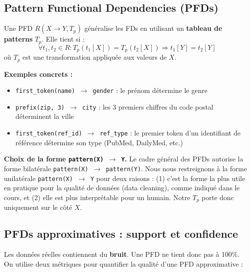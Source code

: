 \documentclass[12pt,a4paper]{article}
\begin{document}
\subsection{Pattern Functional Dependencies (PFDs)}

\begin{tcolorbox}[colback=green!5!white, colframe=green!50!black, title=D\'{e}finition -- Pattern Functional Dependency]
Une PFD $R(X \rightarrow Y, T_p)$ g\'{e}n\'{e}ralise les FDs en utilisant un \textbf{tableau de patterns} $T_p$. Elle tient si :
$$\forall t_1, t_2 \in R : T_p(t_1[X]) = T_p(t_2[X]) \Rightarrow t_1[Y] = t_2[Y]$$
o\`{u} $T_p$ est une transformation appliqu\'{e}e aux valeurs de $X$.
\end{tcolorbox}

\textbf{Exemples concrets :}
\begin{itemize}
    \item \texttt{first\_token(name) $\rightarrow$ gender} : le pr\'{e}nom d\'{e}termine le genre
    \item \texttt{prefix(zip, 3) $\rightarrow$ city} : les 3 premiers chiffres du code postal d\'{e}terminent la ville
    \item \texttt{first\_token(ref\_id) $\rightarrow$ ref\_type} : le premier token d'un identifiant de r\'{e}f\'{e}rence d\'{e}termine son type (PubMed, DailyMed, etc.)
\end{itemize}

\textbf{Choix de la forme \texttt{pattern(X) $\rightarrow$ Y}.} Le cadre g\'{e}n\'{e}ral des PFDs autorise la forme bilat\'{e}rale \texttt{pattern(X) $\rightarrow$ pattern(Y)}. Nous nous restreignons \`{a} la forme unilat\'{e}rale \texttt{pattern(X) $\rightarrow$ Y} pour deux raisons : (1) c'est la forme la plus utile en pratique pour la qualit\'{e} de donn\'{e}es (data cleaning), comme indiqu\'{e} dans le cours, et (2) elle est plus interpr\'{e}table pour un humain. Notre $T_p$ porte donc uniquement sur le c\^{o}t\'{e} $X$.

\subsection{PFDs approximatives : support et confidence}
\label{subsec:metrics}

Les donn\'{e}es r\'{e}elles contiennent du \textbf{bruit}. Une PFD ne tient donc pas \`{a} 100\%. On utilise deux m\'{e}triques pour quantifier la qualit\'{e} d'une PFD approximative :
\end{document}
